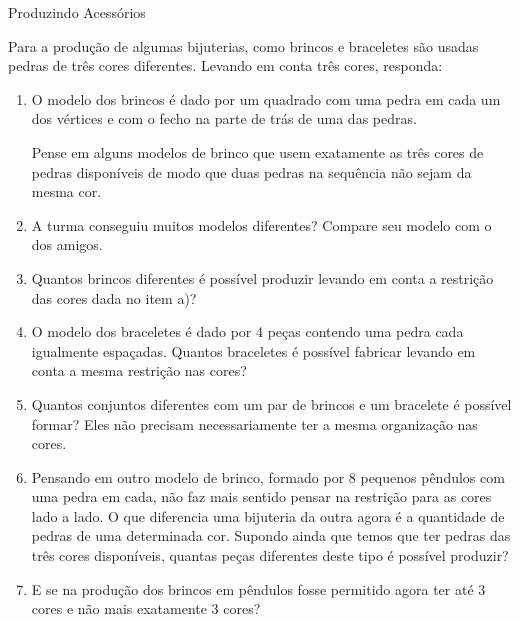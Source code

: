 \begin{task}{Produzindo Acessórios}

Para a produção de algumas bijuterias, como brincos e braceletes são usadas pedras de três cores diferentes. Levando em conta três cores, responda:
 
\begin{enumerate}
\item O modelo dos brincos é dado por um quadrado com uma pedra em cada um dos vértices e com o fecho na parte de trás de uma das pedras. 

\begin{figure}[H]
\centering

\end{figure}

Pense em alguns modelos de brinco que usem exatamente as  três cores de pedras disponíveis de modo que duas pedras na sequência não sejam da mesma cor.

\item A turma conseguiu muitos modelos diferentes? Compare seu modelo com o dos amigos.
\item Quantos brincos diferentes é possível produzir levando em conta a restrição das cores dada no item a)?
\item O modelo dos braceletes é dado por 4 peças contendo uma pedra cada igualmente espaçadas.  Quantos braceletes é possível fabricar levando em conta a mesma restrição nas cores?
\item Quantos conjuntos diferentes com um par de brincos e um bracelete é possível formar? Eles não precisam necessariamente ter a mesma organização nas cores.
\item Pensando em outro modelo de brinco, formado por 8 pequenos pêndulos com uma pedra em cada, não faz mais sentido pensar na restrição para as cores lado a lado. O que diferencia uma bijuteria da outra agora é a quantidade de pedras de uma determinada cor. Supondo ainda que temos que ter pedras das três cores disponíveis,  quantas peças diferentes deste tipo é possível produzir?  
\item E se na produção dos brincos em pêndulos fosse permitido agora ter até 3 cores e não mais exatamente 3 cores? 
      
 \end{enumerate}
\end{task}

